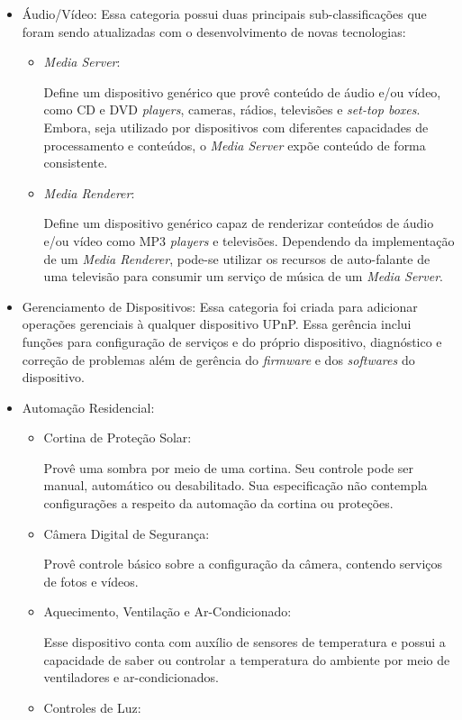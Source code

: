 \begin{itemize}
\item Áudio/Vídeo:
	Essa categoria possui duas principais sub-classificações que foram sendo atualizadas com o desenvolvimento de novas tecnologias: 
	\begin{itemize}
		\item \emph{Media Server}:

			Define um dispositivo genérico que provê conteúdo de áudio e/ou vídeo, como CD e DVD \emph{players}, cameras, rádios, televisões e \emph{set-top boxes}. Embora, seja utilizado por dispositivos com diferentes capacidades de processamento e conteúdos, o \emph{Media Server} expõe conteúdo de forma consistente.

		\item \emph{Media Renderer}:

			Define um dispositivo genérico capaz de renderizar conteúdos de áudio e/ou vídeo como MP3 \emph{players} e televisões. Dependendo da implementação de um \emph{Media Renderer}, pode-se utilizar os recursos de auto-falante de uma televisão para consumir um serviço de música de um \emph{Media Server}.
	\end{itemize}
\item Gerenciamento de Dispositivos:
	Essa categoria foi criada para adicionar operações gerenciais à qualquer dispositivo UPnP. Essa gerência inclui funções para configuração de serviços e do próprio dispositivo, diagnóstico e correção de problemas além de gerência do \emph{firmware} e dos \emph{softwares} do dispositivo.

\item Automação Residencial:
	\begin{itemize}
		\item Cortina de Proteção Solar:

			Provê uma sombra por meio de uma cortina. Seu controle pode ser manual, automático ou desabilitado. Sua especificação não contempla configurações a respeito da automação da cortina ou proteções.
		\item Câmera Digital de Segurança:

			Provê controle básico sobre a configuração da câmera, contendo serviços de fotos e vídeos.
		\item Aquecimento, Ventilação e Ar-Condicionado:
			
			Esse dispositivo conta com auxílio de sensores de temperatura e possui a capacidade de saber ou controlar a temperatura do ambiente por meio de ventiladores e ar-condicionados.
		\item Controles de Luz:
			

\end{itemize}
\end{itemize}
